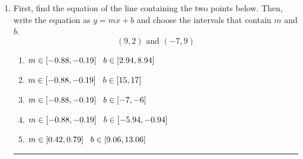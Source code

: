 \documentclass[14pt]{extbook}
\newcommand{\litem}[1]{\item#1\hspace*{-1cm}\rule{\textwidth}{0.4pt}}
\begin{document}
\begin{enumerate}
{\begin{enumerate}[label=\Alph*.]
\end{enumerate} }
\litem{
First, find the equation of the line containing the two points below. Then, write the equation as $ y=mx+b $ and choose the intervals that contain $m$ and $b$.\[ (9, 2) \text{ and } (-7, 9) \]\begin{enumerate}[label=\Alph*.]
\item \( m \in [-0.88, -0.19] \hspace*{3mm} b \in [2.94, 8.94] \)
\item \( m \in [-0.88, -0.19] \hspace*{3mm} b \in [15, 17] \)
\item \( m \in [-0.88, -0.19] \hspace*{3mm} b \in [-7, -6] \)
\item \( m \in [-0.88, -0.19] \hspace*{3mm} b \in [-5.94, -0.94] \)
\item \( m \in [0.42, 0.79] \hspace*{3mm} b \in [9.06, 13.06] \)

\end{enumerate} }
\end{enumerate}
\end{document}
